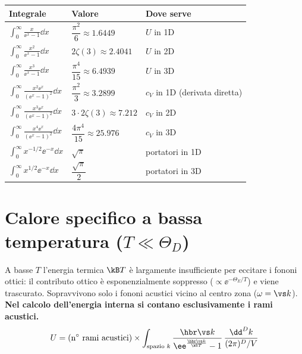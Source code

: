 \begin{center}
\renewcommand{\arraystretch}{2.0}
\begin{tabular}{l l l}
\toprule
Integrale & Valore & Dove serve \\
\midrule
$\displaystyle\int_0^\infty \frac{x}{\ee^x-1}\dd x$ & $\dfrac{\pi^2}{6}\approx 1.6449$ & $U$ in 1D \\
$\displaystyle\int_0^\infty \frac{x^2}{\ee^x-1}\dd x$ & $2\zeta(3)\approx 2.4041$ & $U$ in 2D \\
$\displaystyle\int_0^\infty \frac{x^3}{\ee^x-1}\dd x$ & $\dfrac{\pi^4}{15}\approx 6.4939$ & $U$ in 3D \\
$\displaystyle\int_0^\infty \frac{x^2\ee^x}{(\ee^x-1)^2}\dd x$ & $\dfrac{\pi^2}{3}\approx 3.2899$ & $c_V$ in 1D (derivata diretta) \\
$\displaystyle\int_0^\infty \frac{x^3\ee^x}{(\ee^x-1)^2}\dd x$ & $3\cdot 2\zeta(3)\approx 7.212$ & $c_V$ in 2D \\
$\displaystyle\int_0^\infty \frac{x^4\ee^x}{(\ee^x-1)^2}\dd x$ & $\dfrac{4\pi^4}{15}\approx 25.976$ & $c_V$ in 3D \\
$\displaystyle\int_0^\infty x^{-1/2}\ee^{-x}\dd x$ & $\sqrt{\pi}$ & portatori in 1D \\
$\displaystyle\int_0^\infty x^{1/2}\ee^{-x}\dd x$ & $\dfrac{\sqrt{\pi}}{2}$ & portatori in 3D \\
\bottomrule
\end{tabular}
\end{center}

\newpage
\section{Calore specifico a bassa temperatura ($T \ll \Theta_D$)}
A basse $T$ l'energia termica $\kB T$ è largamente insufficiente per eccitare i fononi ottici: il contributo ottico è esponenzialmente soppresso ($\propto \ee^{-\Theta_E/T}$) e viene trascurato. Sopravvivono solo i fononi acustici vicino al centro zona ($\omega=\vs k$). \textbf{Nel calcolo dell'energia interna si contano esclusivamente i rami acustici.}
\[ U = (\text{n}^\circ\ \text{rami acustici}) \times \int_{\text{spazio } k} \frac{\hbr \vs k}{\ee^{\frac{\hbr \vs k}{\kB T}} - 1}\, \frac{\dd^D k}{(2\pi)^D / V} \]


